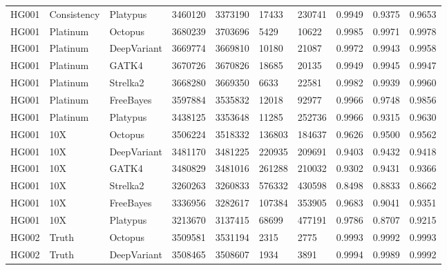 \documentclass{article}
\begin{document}
\begin{table}[ht!]
{\begin{tabular}{llllllllll}
      HG001 &  Consistency &     Platypus &           3460120 &       3373190 &     17433 &    230741 &    0.9949 &      0.9375 &    0.9653 \\
      HG001 &     Platinum &      Octopus &           3680239 &       3703696 &      5429 &     10622 &    0.9985 &      0.9971 &    0.9978 \\
      HG001 &     Platinum &  DeepVariant &           3669774 &       3669810 &     10180 &     21087 &    0.9972 &      0.9943 &    0.9958 \\
      HG001 &     Platinum &        GATK4 &           3670726 &       3670826 &     18685 &     20135 &    0.9949 &      0.9945 &    0.9947 \\
      HG001 &     Platinum &     Strelka2 &           3668280 &       3669350 &      6633 &     22581 &    0.9982 &      0.9939 &    0.9960 \\
      HG001 &     Platinum &    FreeBayes &           3597884 &       3535832 &     12018 &     92977 &    0.9966 &      0.9748 &    0.9856 \\
      HG001 &     Platinum &     Platypus &           3438125 &       3353648 &     11285 &    252736 &    0.9966 &      0.9315 &    0.9630 \\
      HG001 &          10X &      Octopus &           3506224 &       3518332 &    136803 &    184637 &    0.9626 &      0.9500 &    0.9562 \\
      HG001 &          10X &  DeepVariant &           3481170 &       3481225 &    220935 &    209691 &    0.9403 &      0.9432 &    0.9418 \\
      HG001 &          10X &        GATK4 &           3480829 &       3481016 &    261288 &    210032 &    0.9302 &      0.9431 &    0.9366 \\
      HG001 &          10X &     Strelka2 &           3260263 &       3260833 &    576332 &    430598 &    0.8498 &      0.8833 &    0.8662 \\
      HG001 &          10X &    FreeBayes &           3336956 &       3282617 &    107384 &    353905 &    0.9683 &      0.9041 &    0.9351 \\
      HG001 &          10X &     Platypus &           3213670 &       3137415 &     68699 &    477191 &    0.9786 &      0.8707 &    0.9215 \\
      HG002 &        Truth &      Octopus &           3509581 &       3531194 &      2315 &      2775 &    0.9993 &      0.9992 &    0.9993 \\
      HG002 &        Truth &  DeepVariant &           3508465 &       3508607 &      1934 &      3891 &    0.9994 &      0.9989 &    0.9992 \\

\end{tabular}}
\end{table}
\end{document}
